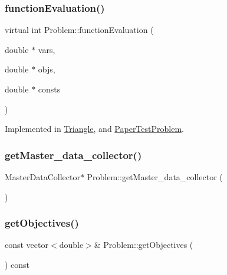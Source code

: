 \subsubsection{\texorpdfstring{function\+Evaluation()}{functionEvaluation()}}
{\footnotesize\ttfamily virtual int Problem\+::function\+Evaluation (\begin{DoxyParamCaption}\item[{double $\ast$}]{vars,  }\item[{double $\ast$}]{objs,  }\item[{double $\ast$}]{consts }\end{DoxyParamCaption})\hspace{0.3cm}{\ttfamily [pure virtual]}}



Implemented in \mbox{\hyperlink{classTriangle_a9e95039d098fd61cce1a830b85ed7004}{Triangle}}, and \mbox{\hyperlink{classPaperTestProblem_a6db78df74d40f69a750b164caaca75c7}{Paper\+Test\+Problem}}.

\mbox{\label{classProblem_acf10e6a4a54da1aabea1fa8611e598dc}} 
\subsubsection{\texorpdfstring{get\+Master\+\_\+data\+\_\+collector()}{getMaster\_data\_collector()}}
{\footnotesize\ttfamily Master\+Data\+Collector$\ast$ Problem\+::get\+Master\+\_\+data\+\_\+collector (\begin{DoxyParamCaption}{ }\end{DoxyParamCaption})}

\mbox{\label{classProblem_a64ffd22f18e26eba34013c81dc106212}} 
\subsubsection{\texorpdfstring{get\+Objectives()}{getObjectives()}}
{\footnotesize\ttfamily const vector$<$double$>$\& Problem\+::get\+Objectives (\begin{DoxyParamCaption}{ }\end{DoxyParamCaption}) const}



